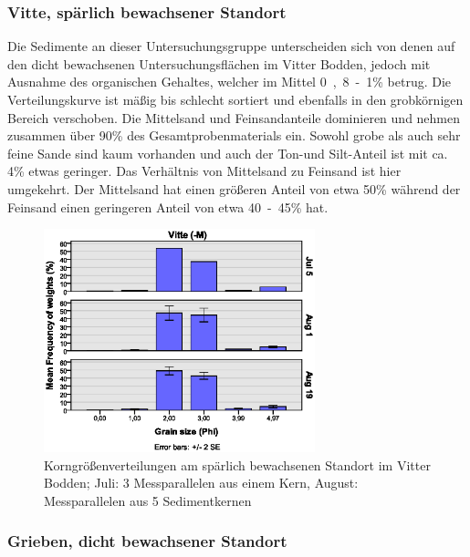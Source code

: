 \subsubsection{Vitte, spärlich bewachsener Standort}

Die Sedimente an dieser Untersuchungsgruppe unterscheiden sich von denen auf den dicht bewachsenen Untersuchungsflächen im Vitter Bodden, jedoch mit Ausnahme des organischen Gehaltes, welcher im Mittel \unit{0,8-1}{\%} betrug. Die Verteilungskurve ist mäßig bis schlecht sortiert und ebenfalls in den grobkörnigen Bereich verschoben. Die Mittelsand und Feinsandanteile dominieren und nehmen zusammen über \unit{90}{\%} des Gesamtprobenmaterials ein. Sowohl grobe als auch sehr feine Sande sind kaum vorhanden und auch der Ton-und Silt-Anteil ist mit ca. \unit{4}{\%} etwas geringer. Das Verhältnis von Mittelsand zu Feinsand ist hier umgekehrt. Der Mittelsand hat einen größeren Anteil von etwa \unit{50}{\%} während der Feinsand einen geringeren Anteil von etwa \unit{40-45}{\%} hat. 


\begin{figure}[!htb]
\centering
\includegraphics[width=0.70\textwidth]{images/grainsize/sediment_im_jahr2.eps}
\caption[Korngrößenverteilungen Vitte (-M)]{Korngrößenverteilungen am spärlich bewachsenen Standort im Vitter Bodden; Juli: 3 Messparallelen aus einem Kern, August: Messparallelen aus 5 Sedimentkernen}
\label{fig:korngrössen_Vitte_-m}
\end{figure}


\subsubsection{Grieben, dicht bewachsener Standort}

